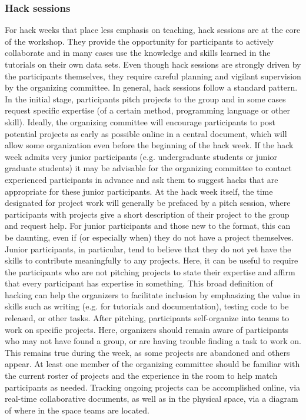 \documentclass{aastex62}
\begin{document}
\subsubsection{Hack sessions}

For hack weeks that place less emphasis on teaching, hack sessions are at the core of the workshop. They provide the opportunity for participants to actively collaborate and in many cases use the knowledge and skills learned in the tutorials on their own data sets. Even though hack sessions are strongly driven by the participants themselves, they require careful planning and vigilant supervision by the organizing committee. In general, hack sessions follow a standard pattern. In the initial stage, participants pitch projects to the group and in some cases request specific expertise (of a certain method, programming language or other skill). Ideally, the organizing committee will encourage participants to post potential projects as early as possible online in a central document, which will allow some organization even before the beginning of the hack week. If the hack week admits very junior participants (e.g. undergraduate students or junior graduate students) it may be advisable for the organizing committee to contact experienced participants in advance and ask them to suggest hacks that are appropriate for these junior participants.
At the hack week itself, the time designated for project work will generally be prefaced by a pitch session, where participants with projects give a short description of their project to the group and request help. For junior participants and those new to the format, this can be daunting, even if (or especially when) they do not have a project themselves. Junior participants, in particular, tend to believe that they do not yet have the skills to contribute meaningfully to any projects. Here, it can be useful to require the participants who are not pitching projects to state their expertise and affirm that every participant has expertise in something. This broad definition of hacking can help the organizers to facilitate inclusion by emphasizing the value in skills such as writing (e.g. for tutorials and documentation), testing code to be released, or other tasks. After pitching, participants self-organize into teams to work on specific projects. Here, organizers should remain aware of participants who may not have found a group, or are having trouble finding a task to work on. This remains true during the week, as some projects are abandoned and others appear. At least one member of the organizing committee should be familiar with the current roster of projects and the experience in the room to help match participants as needed. Tracking ongoing projects can be accomplished online, via real-time collaborative documents, as well as in the physical space, via a diagram of where in the space teams are located.
\end{document}

